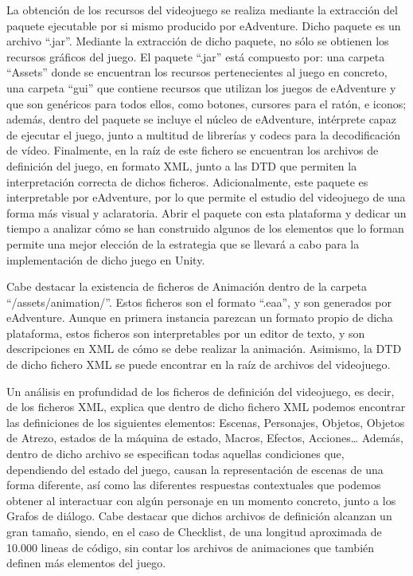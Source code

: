La obtención de los recursos del videojuego se realiza mediante la extracción del paquete ejecutable por si mismo producido por eAdventure. Dicho paquete es un archivo “.jar”. Mediante la extracción de dicho paquete, no sólo se obtienen los recursos gráficos del juego. El paquete “.jar” está compuesto por: una carpeta “Assets” donde se encuentran los recursos pertenecientes al juego en concreto, una carpeta “gui” que contiene recursos que utilizan los juegos de eAdventure y que son genéricos para todos ellos, como botones, cursores para el ratón, e iconos; además, dentro del paquete se incluye el núcleo de eAdventure, intérprete capaz de ejecutar el juego, junto a multitud de librerías y codecs para la decodificación de vídeo. Finalmente, en la raíz de este fichero se encuentran los archivos de definición del juego, en formato XML, junto a las DTD que permiten la interpretación correcta de dichos ficheros. Adicionalmente, este paquete es interpretable por eAdventure, por lo que permite el estudio del videojuego de una forma más visual y aclaratoria. Abrir el paquete con esta plataforma y dedicar un tiempo a analizar cómo se han construido algunos de los elementos que lo forman permite una mejor elección de la estrategia que se llevará a cabo para la implementación de dicho juego en Unity.

Cabe destacar la existencia de ficheros de Animación dentro de la carpeta “/assets/animation/”. Estos ficheros son el formato “.eaa”, y son generados por eAdventure. Aunque en primera instancia parezcan un formato propio de dicha plataforma, estos ficheros son interpretables por un editor de texto, y son descripciones en XML de cómo se debe realizar la animación. Asimismo, la DTD de dicho fichero XML se puede encontrar en la raíz de archivos del videojuego. 

Un análisis en profundidad de los ficheros de definición del videojuego, es decir, de los ficheros XML, explica que dentro de dicho fichero XML podemos encontrar las definiciones de los siguientes elementos: Escenas, Personajes, Objetos, Objetos de Atrezo, estados de la máquina de estado, Macros, Efectos, Acciones… Además, dentro de dicho archivo se especifican todas aquellas condiciones que, dependiendo del estado del juego, causan la representación de escenas de una forma diferente, así como las diferentes respuestas contextuales que podemos obtener al interactuar con algún personaje en un momento concreto, junto a los Grafos de diálogo. Cabe destacar que dichos archivos de definición alcanzan un gran tamaño, siendo, en el caso de Checklist, de una longitud aproximada de 10.000 lineas de código, sin contar los archivos de animaciones que también definen más elementos del juego. 

